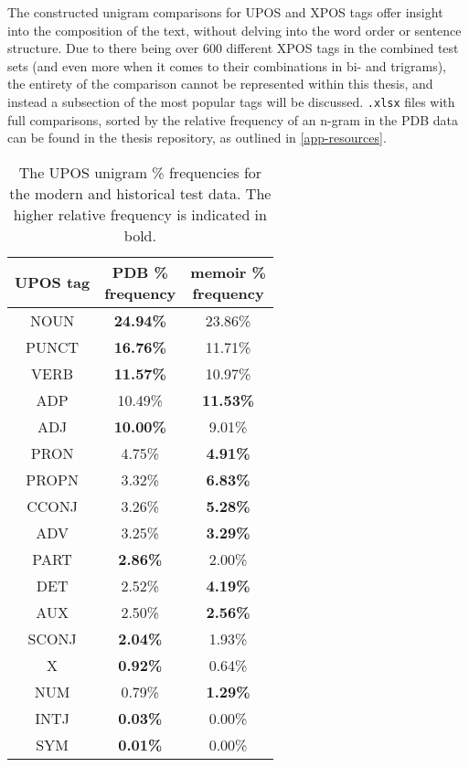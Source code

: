 The constructed unigram comparisons for UPOS and XPOS tags offer insight into the composition of the text, without delving into the word order or sentence structure. Due to there being over 600 different XPOS tags in the combined test sets (and even more when it comes to their combinations in bi- and trigrams), the entirety of the comparison cannot be represented within this thesis, and instead a subsection of the most popular tags will be discussed. \texttt{.xlsx} files with full comparisons, sorted by the relative frequency of an n-gram in the PDB data can be found in the thesis repository, as outlined in \autoref{app-resources}. 

\renewcommand{\arraystretch}{1.25}
\begin{table}[H]
\begin{center}
\begin{tabular}{|c|cc|}
\hline \bf UPOS tag & \bf \makecell[c]{PDB \% \\ frequency} & \bf \makecell[c]{memoir \% \\ frequency} \\ \hline
NOUN & \textbf{24.94\%} & 23.86\% \\
PUNCT & \textbf{16.76\%} & 11.71\% \\
VERB & \textbf{11.57\%} & 10.97\% \\
ADP & 10.49\% & \textbf{11.53\%} \\
ADJ & \textbf{10.00\%} & 9.01\% \\
PRON & 4.75\% & \textbf{4.91\%} \\
PROPN & 3.32\% & \textbf{6.83\%} \\
CCONJ & 3.26\% &\textbf{ 5.28\%} \\
ADV & 3.25\% & \textbf{3.29\%} \\
PART & \textbf{2.86\%} & 2.00\% \\
DET & 2.52\% & \textbf{4.19\%} \\
AUX & 2.50\% & \textbf{2.56\%} \\
SCONJ & \textbf{2.04\%} & 1.93\% \\
X & \textbf{0.92\%} & 0.64\% \\
NUM & 0.79\% & \textbf{1.29\%} \\
INTJ & \textbf{0.03\%} & 0.00\% \\
SYM & \textbf{0.01\%} & 0.00\% \\
\hline
\end{tabular}
\caption{\label{table:upos-unigrams} The UPOS unigram \% frequencies for the modern and historical test data. The higher relative frequency is indicated in bold.}
\end{center}
\end{table}

